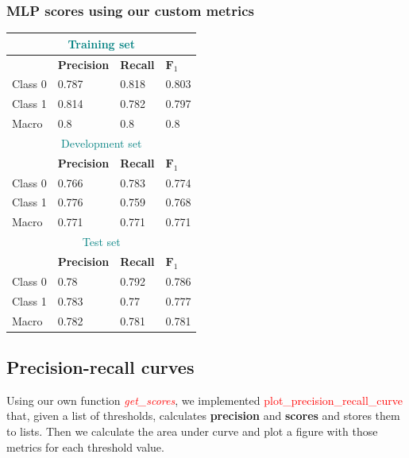 \documentclass[10pt]{article}
\begin{document}
\subsubsection*{MLP scores using our custom metrics}
\begin{tabular}{ |p{2cm}||p{3cm}|p{3cm}|p{3cm}|  }
 \hline
 \multicolumn{4}{|c|}{\textcolor{teal}{Training set}} \\
 \hline
  & \textbf{Precision} &  \textbf{Recall} & $\textbf{F}_1$\\
 \hline
 Class 0 & 0.787 & 0.818 & 0.803 \\
 Class 1 & 0.814 & 0.782 & 0.797 \\  \hline
 Macro & 0.8 & 0.8 & 0.8 \\
 \hline
  \hline
  
   \multicolumn{4}{|c|}{\textcolor{teal}{Development set}} \\
 \hline
  & \textbf{Precision} &  \textbf{Recall} & $\textbf{F}_1$\\
 \hline
 Class 0 & 0.766 & 0.783 & 0.774 \\
 Class 1 & 0.776 & 0.759 & 0.768 \\  \hline
 Macro & 0.771 & 0.771 & 0.771 \\
 \hline
  \hline
  
  \multicolumn{4}{|c|}{\textcolor{teal}{Test set}} \\
 \hline
  & \textbf{Precision} &  \textbf{Recall} & $\textbf{F}_1$\\
 \hline
 Class 0 & 0.78 & 0.792 & 0.786 \\
 Class 1 & 0.783  & 0.77 & 0.777 \\  \hline
 Macro & 0.782 & 0.781 & 0.781 \\
 \hline
 \hline
\end{tabular}
\bigskip

\subsection*{Precision-recall curves}
Using our own function \textcolor{red}{\textit{get\_scores}}, we implemented \textcolor{red}{plot\_precision\_recall\_curve} that, given a list of thresholds, calculates \textbf{precision} and \textbf{scores} and stores them to lists. Then we calculate the area under curve and plot a figure with those metrics for each threshold value.
\end{document}

